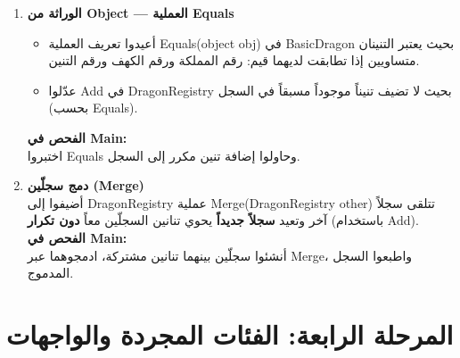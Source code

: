 \documentclass[14pt]{extarticle}
\begin{document}
\begin{enumerate}[resume, label=\textbf{تمرين \arabic*:}, wide=0pt, leftmargin=*, itemsep=2.2em]
    \item \textbf{الوراثة من \textenglish{Object} — العملية \textenglish{Equals}}
    \begin{itemize}
        \item أعيدوا تعريف العملية \textenglish{Equals(object obj)} في \textenglish{BasicDragon} بحيث يعتبر التنينان متساويين إذا تطابقت لديهما قيم: رقم المملكة ورقم الكهف ورقم التنين.
        \item عدّلوا \textenglish{Add} في \textenglish{DragonRegistry} بحيث لا تضيف تنيناً موجوداً مسبقاً في السجل (بحسب \textenglish{Equals}).
    \end{itemize}
    \textbf{الفحص في \textenglish{Main}:} \\
    اختبروا \textenglish{Equals} وحاولوا إضافة تنين مكرر إلى السجل.

    \item \textbf{دمج سجلّين (\textenglish{Merge})} \\
    أضيفوا إلى \textenglish{DragonRegistry} عملية \textenglish{Merge(DragonRegistry other)} تتلقى سجلاً آخر وتعيد \textbf{سجلاً جديداً} يحوي تنانين السجلّين معاً \textbf{دون تكرار} (باستخدام \textenglish{Add}). \\
    \textbf{الفحص في \textenglish{Main}:} \\
    أنشئوا سجلّين بينهما تنانين مشتركة، ادمجوهما عبر \textenglish{Merge}، واطبعوا السجل المدموج.

\end{enumerate}

\clearpage

\section*{المرحلة الرابعة: الفئات المجردة والواجهات}
\end{document}
